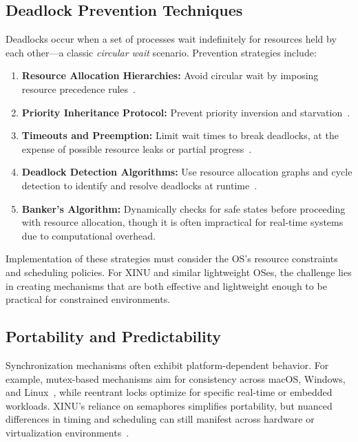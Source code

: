 \documentclass[conference,a4paper]{IEEEtran}
\begin{document}
\subsection{Deadlock Prevention Techniques}

Deadlocks occur when a set of processes wait indefinitely for resources held by each other—a classic \textit{circular wait} scenario. Prevention strategies include:

\begin{enumerate}
    \item \textbf{Resource Allocation Hierarchies:} Avoid circular wait by imposing resource precedence rules~\cite{jetir}.
    \item \textbf{Priority Inheritance Protocol:} Prevent priority inversion and starvation~\cite{bbk, xinuosdeadlocks}.
    \item \textbf{Timeouts and Preemption:} Limit wait times to break deadlocks, at the expense of possible resource leaks or partial progress~\cite{ijcsns}.
    \item \textbf{Deadlock Detection Algorithms:} Use resource allocation graphs and cycle detection to identify and resolve deadlocks at runtime~\cite{wisconsin}.
    \item \textbf{Banker's Algorithm:} Dynamically checks for safe states before proceeding with resource allocation, though it is often impractical for real-time systems due to computational overhead.
\end{enumerate}

Implementation of these strategies must consider the OS's resource constraints and scheduling policies. For XINU and similar lightweight OSes, the challenge lies in creating mechanisms that are both effective and lightweight enough to be practical for constrained environments.

\subsection{Portability and Predictability}

Synchronization mechanisms often exhibit platform-dependent behavior. For example, mutex-based mechanisms aim for consistency across macOS, Windows, and Linux~\cite{arxiv}, while reentrant locks optimize for specific real-time or embedded workloads. XINU’s reliance on semaphores simplifies portability, but nuanced differences in timing and scheduling can still manifest across hardware or virtualization environments~\cite{purdue}.
\end{document}
